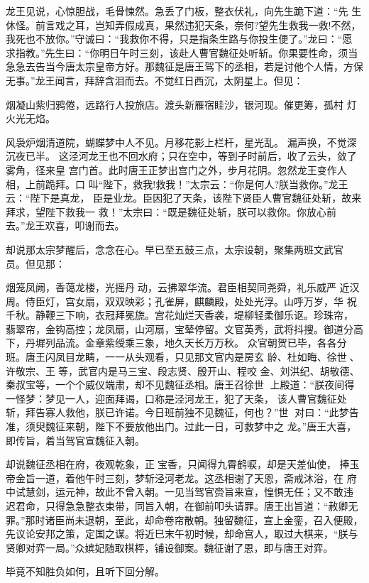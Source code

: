 龙王见说，心惊胆战，毛骨悚然。急丢了门板，整衣伏礼，向先生跪下道：“先
生休怪。前言戏之耳，岂知弄假成真，果然违犯天条，奈何?望先生救我一救!不然，
我死也不放你。”守诚曰：“我救你不得，只是指条生路与你投生便了。”龙曰：“愿
求指教。”先生曰：“你明日午时三刻，该赴人曹官魏征处听斩。你果要性命，须当
急急去告当今唐太宗皇帝方好。那魏征是唐王驾下的丞相，若是讨他个人情，方保
无事。”龙王闻言，拜辞含泪而去。不觉红日西沉，太阴星上。但见：

烟凝山紫归鸦倦，远路行人投旅店。渡头新雁宿眭沙，银河现。催更筹，孤村
灯火光无焰。

风袅炉烟清道院，蝴蝶梦中人不见。月移花影上栏杆，星光乱。
漏声换，不觉深沉夜已半。
这泾河龙王也不回水府；只在空中，等到子时前后，收了云头，敛了雾角，径来皇
宫门首。此时唐王正梦出宫门之外，步月花阴。忽然龙王变作人相，上前跪拜。口
叫“陛下，救我!救我！”太宗云：“你是何人?朕当救你。”龙王云：“陛下是真龙，
臣是业龙。臣因犯了天条，该陛下贤臣人曹官魏征处斩，故来拜求，望陛下救我一
救！”太宗曰：“既是魏征处斩，朕可以救你。你放心前去。”龙王欢喜，叩谢而去。

却说那太宗梦醒后，念念在心。早已至五鼓三点，太宗设朝，聚集两班文武官
员。但见那：

烟笼凤阙，香蔼龙楼，光摇丹动，云拂翠华流。君臣相契同尧舜，礼乐威严
近汉周。侍臣灯，宫女扇，双双映彩；孔雀屏，麒麟殿，处处光浮。山呼万岁，华
祝千秋。静鞭三下响，衣冠拜冕旒。宫花灿烂天香袭，堤柳轻柔御乐讴。珍珠帘，
翡翠帘，金钩高控；龙凤扇，山河扇，宝辇停留。文官英秀，武将抖搜。御道分高
下，丹墀列品流。金章紫绶乘三象，地久天长万万秋。
众官朝贺已毕，各各分班。唐王闪凤目龙睛，一一从头观看，只见那文官内是房玄
龄、杜如晦、徐世、许敬宗、王等，武官内是马三宝、段志贤、殷开山、程咬
金、刘洪纪、胡敬德、秦叔宝等，一个个威仪端肃，却不见魏征丞相。唐王召徐世
上殿道：“朕夜间得一怪梦：梦见一人，迎面拜谒，口称是泾河龙王，犯了天条，
该人曹官魏征处斩，拜告寡人救他，朕已许诺。今日班前独不见魏征，何也？”世
对曰：“此梦告准，须臾魏征来朝，陛下不要放他出门。过此一日，可救梦中之
龙。”唐王大喜，即传旨，着当驾官宣魏征入朝。

却说魏征丞相在府，夜观乾象，正宝香，只闻得九霄鹤唳，却是天差仙使，
捧玉帝金旨一道，着他午时三刻，梦斩泾河老龙。这丞相谢了天恩，斋戒沐浴，在
府中试慧剑，运元神，故此不曾入朝。一见当驾官赍旨来宣，惶惧无任；又不敢违
迟君命，只得急急整衣束带，同旨入朝，在御前叩头请罪。唐王出旨道：“赦卿无
罪。”那时诸臣尚未退朝，至此，却命卷帘散朝。独留魏征，宣上金銮，召入便殿，
先议论安邦之策，定国之谋。将近巳末午初时候，却命宫人，取过大棋来，“朕与
贤卿对弈一局。”众嫔妃随取棋枰，铺设御案。魏征谢了恩，即与唐王对弈。

毕竟不知胜负如何，且听下回分解。